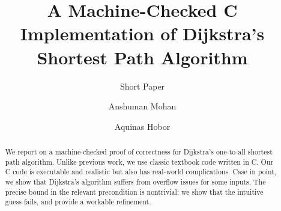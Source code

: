 \documentclass[runningheads]{llncs}
\title{A Machine-Checked C Implementation of Dijkstra's Shortest Path Algorithm}
\subtitle{Short Paper}
\begin{document}
\author{Anshuman Mohan \and Aquinas Hobor}

%


\maketitle








\begin{abstract}
\vspace{-2em}
We report on a machine-checked proof of correctness for 
Dijkstra’s one-to-all shortest path algorithm. 
Unlike previous work, we use classic textbook code written in C.
Our C code is executable and realistic but also has real-world complications. 
Case in point, we show that Dijkstra’s algorithm suffers from 
overflow issues for some inputs.
The precise bound in the relevant precondition is 
nontrivial: we show that the intuitive guess 
fails, and provide a workable refinement.

\end{abstract}
\end{document}

